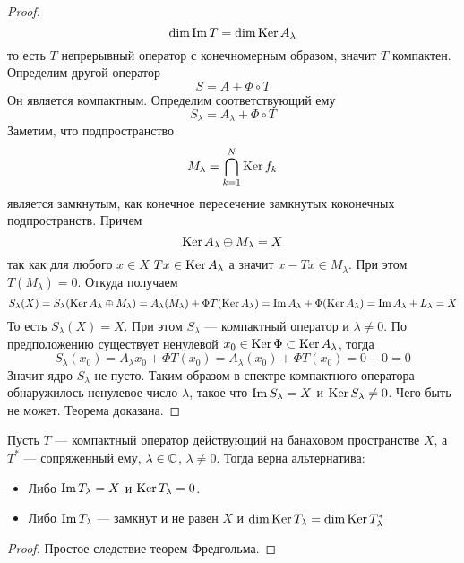 \begin{proof}
	$$
	\dim \operatorname{Im} T = \dim \operatorname{Ker} A_\lambda
	$$
	то есть $T$ непрерывный оператор с конечномерным образом, значит $T$ компактен. Определим другой оператор 
	$$
	S = A + \Phi \circ T
	$$
	Он является компактным. Определим соответствующий ему
	$$
	S_\lambda = A_\lambda + \Phi \circ T 
	$$
	Заметим, что подпространство
	$$
	M_\lambda = \bigcap_{k=1}^N \operatorname{Ker} f_k
	$$
	является замкнутым, как конечное пересечение замкнутых коконечных подпространств. Причем
	$$
	\operatorname{Ker} A_\lambda \oplus M_\lambda = X
	$$
	так как для любого $x \in X$ $Tx \in \operatorname{Ker} A_\lambda$ а значит $x - Tx \in M_\lambda$. При этом $T(M_\lambda) = 0$. Откуда получаем
	$$
	S_\lambda(X) = S_\lambda(\operatorname{Ker} A_\lambda \oplus M_\lambda) = A_\lambda(M_\lambda) + \Phi T(\operatorname{Ker} A_\lambda) = \operatorname{Im} A_\lambda + \Phi(\operatorname{Ker} A_\lambda) = \operatorname{Im} A_\lambda + L_\lambda = X
	$$
	То есть $S_\lambda(X)  = X$. При этом $S_\lambda$ --- компактный оператор и $\lambda \neq 0$. По предположению существует ненулевой $x_0 \in \operatorname{Ker} \Phi \subset \operatorname{Ker} A_\lambda$, тогда 
	$$
	S_\lambda (x_0) = A_\lambda x_0  + \Phi T(x_0) = A_\lambda (x_0) + \Phi T(x_0) = 0 + 0 = 0
	$$
	Значит ядро $S_\lambda$ не пусто. Таким образом в спектре компактного оператора обнаружилось ненулевое число $\lambda$, такое что $\operatorname{Im} S_\lambda = X$ и $\operatorname{Ker} S_\lambda \neq 0$. Чего быть не может. Теорема доказана. 
\end{proof} 

\begin{theorem}
	Пусть $T$ --- компактный оператор действующий на банаховом пространстве $X$, а $T^*$ --- сопряженный ему, $\lambda \in \mathbb{C}$, $\lambda \neq 0$. Тогда верна альтернатива:
	\begin{itemize}
		\item Либо $\operatorname{Im} T_\lambda = X$ и $\operatorname{Ker} T_\lambda = 0$. 
		\item Либо $\operatorname{Im} T_\lambda$ --- замкнут и не равен $X$ и  $\dim \operatorname{Ker} T_\lambda = \dim \operatorname{Ker} T^*_\lambda$ 
	\end{itemize}
\end{theorem}
\begin{proof}
	Простое следствие теорем Фредгольма.
\end{proof}